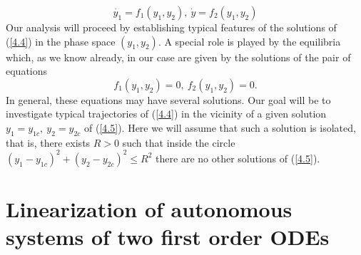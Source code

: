 \documentclass[11pt,a4paper,twoside]{article}
\begin{document}
	\begin{equation}\label{4.4}
		\dot{y_1} = f_1(y_1, y_2),\ \dot{y} = f_2(y_1, y_2)
	\end{equation}
	Our analysis will proceed by establishing typical features of the solutions of (\ref{4.4}) in the phase space $(y_1, y_2)$. A special role is played by the equilibria which, as we know already, in our case are given by the solutions of the pair of equations
	\begin{equation}\label{4.5}
		f_1(y_1, y_2) = 0,\ f_2(y_1, y_2) = 0.
	\end{equation}
	In general, these equations may have several solutions. Our goal will be to investigate typical trajectories of (\ref{4.4}) in the vicinity of a given solution $y_1 = y_{1c},\ y_2 = y_{2c}$ of (\ref{4.5}). Here we will assume that such a solution is isolated, that is, there exists $R > 0$ such that inside the circle $(y_1-y_{1c})^2+(y_2-y_{2c})^2 \leq R^2$ there are no other solutions of (\ref{4.5}).
	\section{Linearization of autonomous systems of two first order ODEs}
\end{document}
